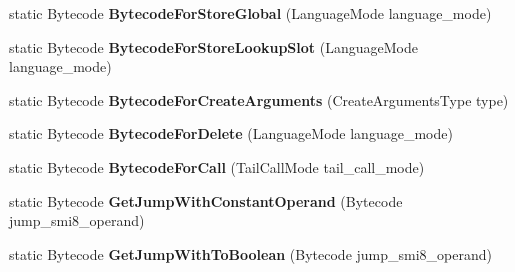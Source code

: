 \begin{DoxyCompactItemize}
\item 
static Bytecode {\bfseries Bytecode\+For\+Store\+Global} (Language\+Mode language\+\_\+mode)\hypertarget{classv8_1_1internal_1_1interpreter_1_1_bytecode_array_builder_a03365a38c9d8f556c9232aae8620e1ff}{}\label{classv8_1_1internal_1_1interpreter_1_1_bytecode_array_builder_a03365a38c9d8f556c9232aae8620e1ff}

\item 
static Bytecode {\bfseries Bytecode\+For\+Store\+Lookup\+Slot} (Language\+Mode language\+\_\+mode)\hypertarget{classv8_1_1internal_1_1interpreter_1_1_bytecode_array_builder_ad10c64ef6ebcffbff6930c6720e3fdd7}{}\label{classv8_1_1internal_1_1interpreter_1_1_bytecode_array_builder_ad10c64ef6ebcffbff6930c6720e3fdd7}

\item 
static Bytecode {\bfseries Bytecode\+For\+Create\+Arguments} (Create\+Arguments\+Type type)\hypertarget{classv8_1_1internal_1_1interpreter_1_1_bytecode_array_builder_af810e688e09c1e5820109667843742bd}{}\label{classv8_1_1internal_1_1interpreter_1_1_bytecode_array_builder_af810e688e09c1e5820109667843742bd}

\item 
static Bytecode {\bfseries Bytecode\+For\+Delete} (Language\+Mode language\+\_\+mode)\hypertarget{classv8_1_1internal_1_1interpreter_1_1_bytecode_array_builder_ab206186a22eb9220eb08b7f7d84d3f58}{}\label{classv8_1_1internal_1_1interpreter_1_1_bytecode_array_builder_ab206186a22eb9220eb08b7f7d84d3f58}

\item 
static Bytecode {\bfseries Bytecode\+For\+Call} (Tail\+Call\+Mode tail\+\_\+call\+\_\+mode)\hypertarget{classv8_1_1internal_1_1interpreter_1_1_bytecode_array_builder_a9a2ad32b2e6b258d3a1f54c23238253f}{}\label{classv8_1_1internal_1_1interpreter_1_1_bytecode_array_builder_a9a2ad32b2e6b258d3a1f54c23238253f}

\item 
static Bytecode {\bfseries Get\+Jump\+With\+Constant\+Operand} (Bytecode jump\+\_\+smi8\+\_\+operand)\hypertarget{classv8_1_1internal_1_1interpreter_1_1_bytecode_array_builder_abc509a4602bc2e9e8776a04cbbbe6db0}{}\label{classv8_1_1internal_1_1interpreter_1_1_bytecode_array_builder_abc509a4602bc2e9e8776a04cbbbe6db0}

\item 
static Bytecode {\bfseries Get\+Jump\+With\+To\+Boolean} (Bytecode jump\+\_\+smi8\+\_\+operand)\hypertarget{classv8_1_1internal_1_1interpreter_1_1_bytecode_array_builder_a3b647ba770a3a0837362acba115362ce}{}\label{classv8_1_1internal_1_1interpreter_1_1_bytecode_array_builder_a3b647ba770a3a0837362acba115362ce}

\end{DoxyCompactItemize}
